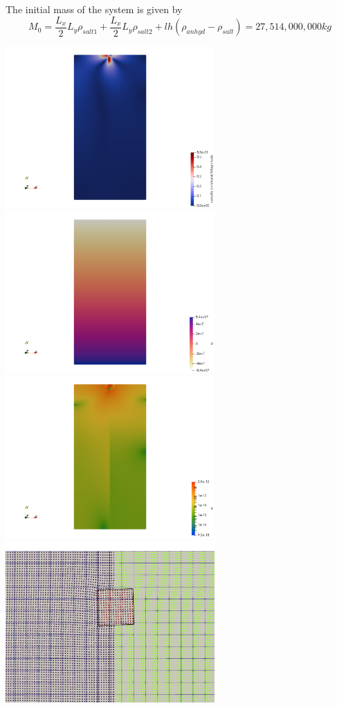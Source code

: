 The initial mass of the system is given by
\[
M_0 = 
\frac{L_x}{2} L_y \rho_{salt1}
+
\frac{L_x}{2} L_y \rho_{salt2}
+
l h (\rho_{anhyd}-\rho_{salt})
=27,514,000,000 kg
\]








\begin{center}
\includegraphics[width=8cm]{python_codes/fieldstone_67/results/buks12/vel}
\includegraphics[width=8cm]{python_codes/fieldstone_67/results/buks12/press}\\
\includegraphics[width=8cm]{python_codes/fieldstone_67/results/buks12/sr}
\includegraphics[width=8cm]{python_codes/fieldstone_67/results/buks12/particles}
\end{center}




 


















